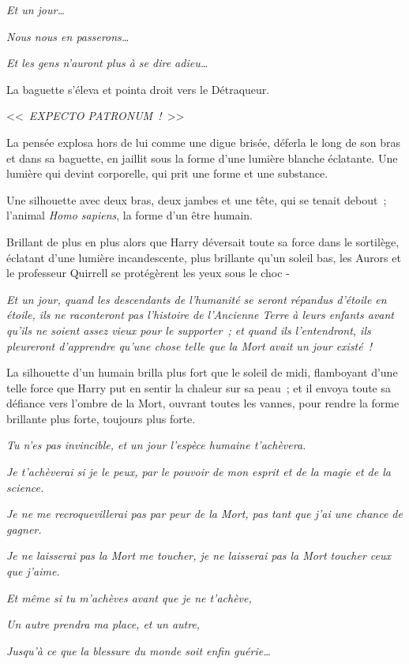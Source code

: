 \emph{Et un jour…}

\emph{Nous nous en passerons…}

\emph{Et les gens n'auront plus à se dire adieu…}

La baguette s'éleva et pointa droit vers le Détraqueur.

<<~\emph{EXPECTO PATRONUM~!}~>>

La pensée explosa hors de lui comme une digue brisée, déferla le long de son bras et dans sa baguette, en jaillit sous la forme d'une lumière blanche éclatante. Une lumière qui devint corporelle, qui prit une forme et une substance.

Une silhouette avec deux bras, deux jambes et une tête, qui se tenait debout~; l'animal \emph{Homo sapiens}, la forme d'un être humain.

Brillant de plus en plus alors que Harry déversait toute sa force dans le sortilège, éclatant d'une lumière incandescente, plus brillante qu'un soleil bas, les Aurors et le professeur Quirrell se protégèrent les yeux sous le choc -

\emph{Et un jour, quand les descendants de l'humanité se seront répandus d'étoile en étoile, ils ne raconteront pas l'histoire de l'Ancienne Terre à leurs enfants avant qu'ils ne soient assez vieux pour le supporter~; et quand ils l'entendront, ils pleureront d'apprendre qu'une chose telle que la Mort avait un jour existé~!}

La silhouette d'un humain brilla plus fort que le soleil de midi, flamboyant d'une telle force que Harry put en sentir la chaleur sur sa peau~; et il envoya toute sa défiance vers l'ombre de la Mort, ouvrant toutes les vannes, pour rendre la forme brillante plus forte, toujours plus forte.

\emph{Tu n'es pas invincible, et un jour l'espèce humaine t'achèvera.}

\emph{Je t'achèverai si je le peux, par le pouvoir de mon esprit et de la magie et de la science.}

\emph{Je ne me recroquevillerai pas par peur de la Mort, pas tant que j'ai une chance de gagner.}

\emph{Je ne laisserai pas la Mort me toucher, je ne laisserai pas la Mort toucher ceux que j'aime.}

\emph{Et même si tu m'achèves avant que je ne t'achève,}

\emph{Un autre prendra ma place, et un autre,}

\emph{Jusqu'à ce que la blessure du monde soit enfin guérie…}

